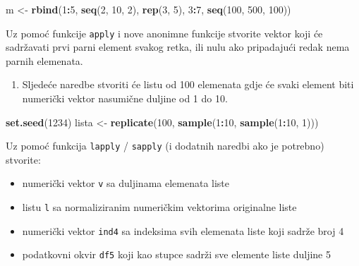 \documentclass[]{book}
\newenvironment{Shaded}{\begin{snugshade}}{\end{snugshade}}
\newcommand{\KeywordTok}[1]{\textcolor[rgb]{0.13,0.29,0.53}{\textbf{#1}}}
\newcommand{\DecValTok}[1]{\textcolor[rgb]{0.00,0.00,0.81}{#1}}
\newcommand{\StringTok}[1]{\textcolor[rgb]{0.31,0.60,0.02}{#1}}
\newcommand{\OperatorTok}[1]{\textcolor[rgb]{0.81,0.36,0.00}{\textbf{#1}}}
\newcommand{\NormalTok}[1]{#1}
\providecommand{\tightlist}{%
  \setlength{\itemsep}{0pt}\setlength{\parskip}{0pt}}
\theoremstyle{definition}
\theoremstyle{definition}
\theoremstyle{definition}
\theoremstyle{remark}
\begin{document}
\begin{Shaded}
\begin{Highlighting}[]
\NormalTok{m <-}\StringTok{ }\KeywordTok{rbind}\NormalTok{(}\DecValTok{1}\OperatorTok{:}\DecValTok{5}\NormalTok{, }\KeywordTok{seq}\NormalTok{(}\DecValTok{2}\NormalTok{, }\DecValTok{10}\NormalTok{, }\DecValTok{2}\NormalTok{), }\KeywordTok{rep}\NormalTok{(}\DecValTok{3}\NormalTok{, }\DecValTok{5}\NormalTok{), }\DecValTok{3}\OperatorTok{:}\DecValTok{7}\NormalTok{, }\KeywordTok{seq}\NormalTok{(}\DecValTok{100}\NormalTok{, }\DecValTok{500}\NormalTok{, }\DecValTok{100}\NormalTok{))}
\end{Highlighting}
\end{Shaded}

Uz pomoć funkcije \texttt{apply} i nove anonimne funkcije stvorite
vektor koji će sadržavati prvi parni element svakog retka, ili nulu ako
pripadajući redak nema parnih elemenata.

\begin{enumerate}
\def\labelenumi{\arabic{enumi}.}
\setcounter{enumi}{1}
\tightlist
\item
  Sljedeće naredbe stvoriti će listu od 100 elemenata gdje će svaki
  element biti numerički vektor nasumične duljine od 1 do 10.
\end{enumerate}

\begin{Shaded}
\begin{Highlighting}[]
\KeywordTok{set.seed}\NormalTok{(}\DecValTok{1234}\NormalTok{)}
\NormalTok{lista <-}\StringTok{ }\KeywordTok{replicate}\NormalTok{(}\DecValTok{100}\NormalTok{, }\KeywordTok{sample}\NormalTok{(}\DecValTok{1}\OperatorTok{:}\DecValTok{10}\NormalTok{, }\KeywordTok{sample}\NormalTok{(}\DecValTok{1}\OperatorTok{:}\DecValTok{10}\NormalTok{, }\DecValTok{1}\NormalTok{)))}
\end{Highlighting}
\end{Shaded}

Uz pomoć funkcija \texttt{lapply} / \texttt{sapply} (i dodatnih naredbi
ako je potrebno) stvorite:

\begin{itemize}
\tightlist
\item
  numerički vektor \texttt{v} sa duljinama elemenata liste
\item
  listu \texttt{l} sa normaliziranim numeričkim vektorima originalne
  liste
\item
  numerički vektor \texttt{ind4} sa indeksima svih elemenata liste koji
  sadrže broj 4
\item
  podatkovni okvir \texttt{df5} koji kao stupce sadrži sve elemente
  liste duljine 5
\end{itemize}
\end{document}

